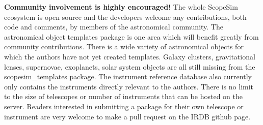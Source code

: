 \textbf{Community involvement is highly encouraged!}
The whole ScopeSim ecosystem is open source and the developers welcome any contributions, both code and comments, by members of the astronomical community.
The astronomical object templates package is one area which will benefit greatly from community contributions.
There is a wide variety of astronomical objects for which the authors have not yet created templates.
Galaxy clusters, gravitational lenses, supernovae, exoplanets, solar system objects are all still missing from the scopesim\_templates package.
The instrument reference database also currently only contains the instruments directly relevant to the authors.
There is no limit to the size of telescopes or number of instruments that can be hosted on the server.
Readers interested in submitting a package for their own telescope or instrument are very welcome to make a pull request on the IRDB github page.
